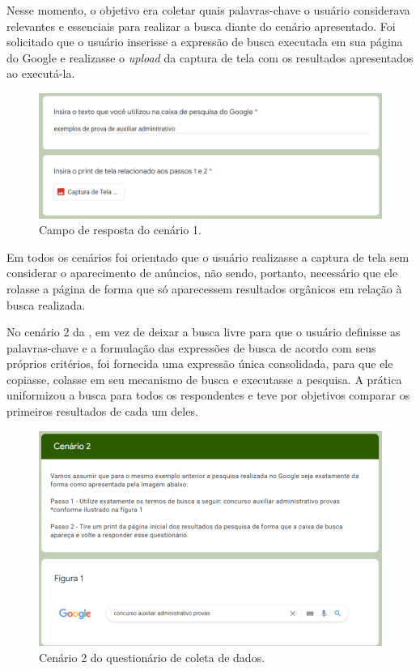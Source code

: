 \documentclass[portuguese]{textolivre}
\begin{document}
Nesse momento, o objetivo era coletar quais palavras-chave o usuário considerava relevantes e essenciais para realizar a busca diante do cenário apresentado. Foi solicitado que o usuário inserisse a expressão de busca executada em sua página do Google e realizasse o \textit{upload} da captura de tela com os resultados apresentados ao executá-la.

\begin{figure}[h!]
    \centering
    \includegraphics[width=0.8\linewidth]{fig-004.png}
    \caption{Campo de resposta do cenário 1.}
    \label{fig4}
\end{figure}

Em todos os cenários foi orientado que o usuário realizasse a captura de tela sem considerar o aparecimento de anúncios, não sendo, portanto, necessário que ele rolasse a página de forma que só aparecessem resultados orgânicos em relação à busca realizada.

No cenário 2 da , em vez de deixar a busca livre para que o usuário definisse as palavras-chave e a formulação das expressões de busca de acordo com seus próprios critérios, foi fornecida uma expressão única consolidada, para que ele copiasse, colasse em seu mecanismo de busca e executasse a pesquisa. A prática uniformizou a busca para todos os respondentes e teve por objetivos comparar os primeiros resultados de cada um deles.

\begin{figure}[h!]
    \centering
    \includegraphics[width=0.8\linewidth]{fig-005.png}
    \caption{Cenário 2 do questionário de coleta de dados.}
    \label{fig5}
\end{figure}
\end{document}
